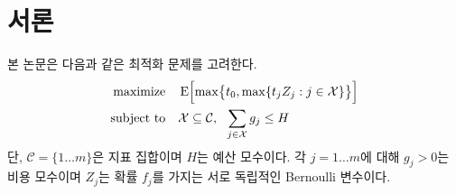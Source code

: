 \documentclass[12pt]{article} %
\newif\ifen
\theoremstyle{definition}
\newtheorem{definition}{Definition}
\theoremstyle{definition}
\newtheorem{definition}{정의}
\begin{document}
\pagebreak
\ifen \section{Introduction}  \else \section{서론} \fi
\ifen This paper considers the portfolio optimization problem
\else 본 논문은 다음과 같은 최적화 문제를 고려한다.\fi
\begin{align}
\begin{split}
\text{maximize}\quad & \operatorname{E}\Bigl[\max\bigr\{t_0,
\max\{t_j Z_j : j \in \mathcal{X}\}\bigr\}\Bigr] \\
\text{subject to}\quad & \mathcal{X} \subseteq \mathcal{C}, ~~\sum_{j\in \mathcal{X}} g_j \leq H
\end{split}
\end{align}
\ifen where $\mathcal{C} = \{ 1 \dots m\}$ is an index set, $H$ is a budget parameter, and for $j = 1 \dots m$, $g_j > 0$ is a cost parameter, $Z_j$ is a random, independent Bernoulli variable with probability $f_j$.
\else 단,  $\mathcal{C} = \{ 1 \dots m\}$은 지표 집합이며 $H$는 예산 모수이다. 각 $j = 1 \dots m$에 대해 $g_j > 0$는 비용 모수이며 $Z_j$는 확률 $f_j$를 가지는 서로 독립적인 Bernoulli 변수이다.\fi
\end{document}

